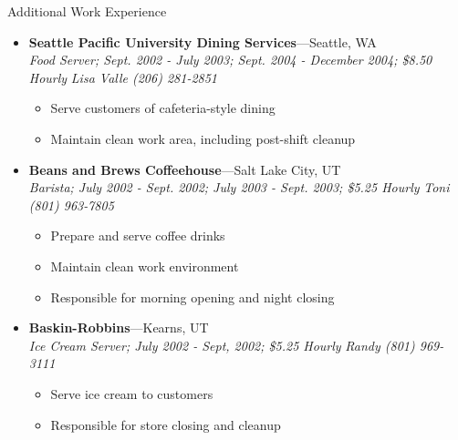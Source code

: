 \documentclass[11pt,oneside]{article}
\newenvironment{ressection}[1]{
	\vspace{4pt}
	{\fontfamily{phv}\selectfont\Large#1}
	\begin{itemize}
	\vspace{3pt}
}{
	\end{itemize}
}
\newcommand{\ressubitem}[1]{
	\vspace{-1pt}
	\item \begin{flushleft} #1 \end{flushleft}
}
\newenvironment{ressubsec}[4]{
	\item
	\textbf{#1}---#2 \\
	\textit{#3}
	\newline
	\textit{#4}
	\vspace{-2pt}
	\begin{itemize}
}{
	\end{itemize}
}
\begin{document}
\begin{ressection}{Additional Work Experience}

	\begin{ressubsec}{Seattle Pacific University Dining Services}{Seattle, WA}{Food Server; Sept. 2002 - July 2003; Sept. 2004 - December 2004; \$8.50 Hourly}{Lisa Valle (206) 281-2851}
		\ressubitem{Serve customers of cafeteria-style dining}
		\ressubitem{Maintain clean work area, including post-shift cleanup}
	\end{ressubsec}

	\begin{ressubsec}{Beans and Brews Coffeehouse}{Salt Lake City, UT}{Barista; July 2002 - Sept. 2002; July 2003 - Sept. 2003; \$5.25 Hourly}{Toni (801) 963-7805}
		\ressubitem{Prepare and serve coffee drinks}
		\ressubitem{Maintain clean work environment}
		\ressubitem{Responsible for morning opening and night closing}
	\end{ressubsec}

	\begin{ressubsec}{Baskin-Robbins}{Kearns, UT}{Ice Cream Server; July 2002 - Sept, 2002; \$5.25 Hourly}{Randy (801) 969-3111}
		\ressubitem{Serve ice cream to customers}
		\ressubitem{Responsible for store closing and cleanup}
	\end{ressubsec}


\end{ressection}
\end{document}
